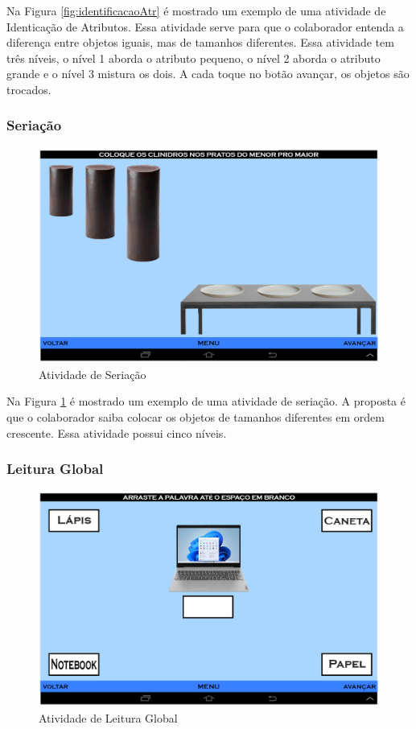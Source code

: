 \documentclass[12pt]{article}
\begin{document}
Na Figura \ref{fig:identificacaoAtr} é mostrado um exemplo de uma atividade de Identicação de Atributos. Essa atividade serve para que o colaborador entenda a diferença entre objetos iguais, mas de tamanhos diferentes. Essa atividade tem três níveis, o nível 1 aborda o atributo pequeno, o nível 2 aborda o atributo grande e o nível 3 mistura os dois. A cada toque no botão avançar, os objetos são trocados.

\subsubsection{Seriação}

 \begin{figure}[h!]
    \centering
    \includegraphics[width=1.0\textwidth]{seriacao.png}
    \caption{ Atividade de Seriação }
    \label{fig:seriacao}
\end{figure}

Na Figura \ref{fig:seriacao} é mostrado um exemplo de uma atividade de seriação. A proposta é que
o colaborador saiba colocar os objetos de tamanhos diferentes em ordem crescente. Essa
atividade possui cinco níveis.


\subsubsection{Leitura Global}

 \begin{figure}[h!]
    \centering
    \includegraphics[width=1.0\textwidth]{leitura_global.png}
    \caption{ Atividade de Leitura Global }
    \label{fig:leitura}
\end{figure}
\end{document}
